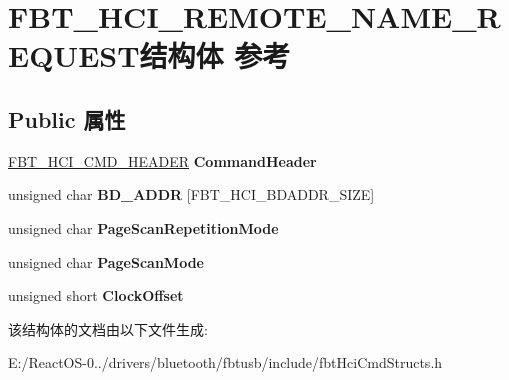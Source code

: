\hypertarget{struct_f_b_t___h_c_i___r_e_m_o_t_e___n_a_m_e___r_e_q_u_e_s_t}{}\section{F\+B\+T\+\_\+\+H\+C\+I\+\_\+\+R\+E\+M\+O\+T\+E\+\_\+\+N\+A\+M\+E\+\_\+\+R\+E\+Q\+U\+E\+S\+T结构体 参考}
\label{struct_f_b_t___h_c_i___r_e_m_o_t_e___n_a_m_e___r_e_q_u_e_s_t}
\subsection*{Public 属性}
\begin{DoxyCompactItemize}
\item 
\mbox{\label{struct_f_b_t___h_c_i___r_e_m_o_t_e___n_a_m_e___r_e_q_u_e_s_t_a36e81599f7b93b6902611065c0cac098}} 
\hyperlink{struct_f_b_t___h_c_i___c_m_d___h_e_a_d_e_r}{F\+B\+T\+\_\+\+H\+C\+I\+\_\+\+C\+M\+D\+\_\+\+H\+E\+A\+D\+ER} {\bfseries Command\+Header}
\item 
\mbox{\label{struct_f_b_t___h_c_i___r_e_m_o_t_e___n_a_m_e___r_e_q_u_e_s_t_ae8d8c9b0efdb431149673421f3269257}} 
unsigned char {\bfseries B\+D\+\_\+\+A\+D\+DR} \mbox{[}F\+B\+T\+\_\+\+H\+C\+I\+\_\+\+B\+D\+A\+D\+D\+R\+\_\+\+S\+I\+ZE\mbox{]}
\item 
\mbox{\label{struct_f_b_t___h_c_i___r_e_m_o_t_e___n_a_m_e___r_e_q_u_e_s_t_a57b0d92ebccdce4d910377a5f2465eb8}} 
unsigned char {\bfseries Page\+Scan\+Repetition\+Mode}
\item 
\mbox{\label{struct_f_b_t___h_c_i___r_e_m_o_t_e___n_a_m_e___r_e_q_u_e_s_t_ae2275f7f1edbe3eb305993eab2ec7df0}} 
unsigned char {\bfseries Page\+Scan\+Mode}
\item 
\mbox{\label{struct_f_b_t___h_c_i___r_e_m_o_t_e___n_a_m_e___r_e_q_u_e_s_t_a477aa1e64363963cd31f2f35008a5043}} 
unsigned short {\bfseries Clock\+Offset}
\end{DoxyCompactItemize}


该结构体的文档由以下文件生成\+:\begin{DoxyCompactItemize}
\item 
E\+:/\+React\+O\+S-\/0../drivers/bluetooth/fbtusb/include/fbt\+Hci\+Cmd\+Structs.\+h\end{DoxyCompactItemize}
